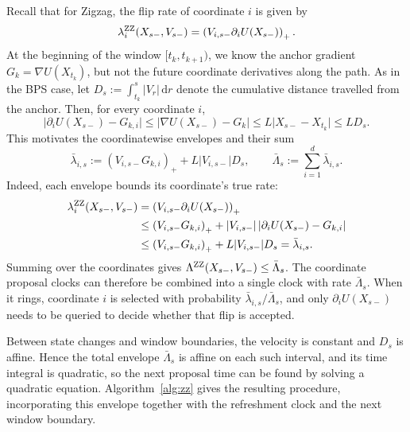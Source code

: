 \documentclass{amsart}
\theoremstyle{plain}
\theoremstyle{definition}
\theoremstyle{remark}
\newcommand{\ud}{\,\mathrm{d}}
\newcommand{\abs}[1]{\lvert#1\rvert}
\newcommand{\1}{\mathbf 1}
\newcommand{\dd}{\ud}
\newcommand{\pos}[1]{\left(#1\right)_+}
\newcommand{\zz}{{\rm ZZ}}
\begin{document}
Recall that for Zigzag, the flip rate of coordinate $i$ is given by
\[
        \lambda_i^{\zz}(X_{s-},V_{s-})
        =\pos{V_{i,s-}\partial_iU(X_{s-})}.
\]
At the beginning of the window $[t_k,t_{k+1})$, we know the anchor gradient
$G_k=\nabla U(X_{t_k})$, but not the future coordinate derivatives along the
path.  As in the BPS case, let
$D_s:=\int_{t_k}^s\abs{V_r}\dd r$ denote the cumulative distance travelled from the
anchor.  Then, for every coordinate $i$,
\[
        \abs{\partial_iU(X_{s-})-G_{k,i}}
        \le\abs{\nabla U(X_{s-})-G_k}
        \le L\abs{X_{s-}-X_{t_k}}
        \le L D_s.
\]
This motivates the coordinatewise envelopes and their sum
\begin{equation}\label{eq:zz-envelope}
        \bar\lambda_{i,s}
        :=\pos{V_{i,s-}G_{k,i}}+L\abs{V_{i,s-}}D_s,
        \qquad
        \bar\Lambda_s:=\sum_{i=1}^d\bar\lambda_{i,s}.
\end{equation}
Indeed, each envelope bounds its coordinate's true rate:
\begin{align*}
        \lambda_i^{\zz}(X_{s-},V_{s-})
        &=\pos{V_{i,s-}\partial_iU(X_{s-})}\\
        &\le\pos{V_{i,s-}G_{k,i}}
             +\abs{V_{i,s-}}\,
              \abs{\partial_iU(X_{s-})-G_{k,i}}\\
        &\le\pos{V_{i,s-}G_{k,i}}+L\abs{V_{i,s-}}D_s
        =\bar\lambda_{i,s}.
\end{align*}
Summing over the coordinates gives
$\Lambda^{\zz}(X_{s-},V_{s-})\le\bar\Lambda_s$.  The coordinate proposal
clocks can therefore be combined into a single clock with rate
$\bar\Lambda_s$.  When it rings, coordinate $i$ is selected
with probability $\bar\lambda_{i,s}/\bar\Lambda_s$, and only
$\partial_iU(X_{s-})$ needs to be queried to decide whether that flip is
accepted.

Between state changes and window boundaries, the velocity is constant and
$D_s$ is affine.  Hence the total envelope $\bar\Lambda_s$ is affine on each
such interval, and its time integral is quadratic, so the next proposal time
can be found by solving a quadratic equation.  Algorithm~\ref{alg:zz} gives
the resulting procedure,
incorporating this envelope together with the refreshment clock and the next
window boundary.
\end{document}
